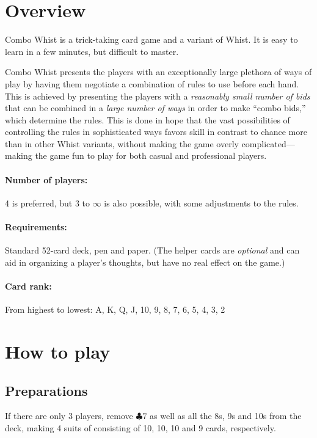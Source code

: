 \documentclass[a4paper]{article} %
\author{By Joakim Nilsson}
\date{Development version (based on version \varVersion-\varLanguage)---\today}
\date{Version \varVersion-\varLanguage---\today}
\begin{document}

	\introPages
	\pagebreak


	\section{Overview}
	Combo Whist is a trick-taking card game and a variant of Whist. It is easy to learn in a few minutes, but difficult to master.

	Combo Whist presents the players with an exceptionally large plethora of ways of play by having them negotiate a combination of rules to use before each hand. This is achieved by presenting the players with a \emph{reasonably small number of bids} that can be combined in a \emph{large number of ways} in order to make ``combo bids,'' which determine the rules. This is done in hope that the vast possibilities of controlling the rules in sophisticated ways favors skill in contrast to chance more than in other Whist variants, without making the game overly complicated---making the game fun to play for both casual and professional players.

	\paragraph{Number of players:}
	4 is preferred, but 3 to $\infty$ is also possible, with some adjustments to the rules.

	\paragraph{Requirements:}
	Standard 52-card deck, pen and paper. (The helper cards are \emph{optional} and can aid in organizing a player's thoughts, but have no real effect on the game.)

	\paragraph{Card rank:}
	From highest to lowest: A, K, Q, J, 10, 9, 8, 7, 6, 5, 4, 3, 2

	\section{How to play}
	\subsection{Preparations}
	If there are only 3 players, remove $\clubsuit 7$ as well as all the 8s, 9s and 10s from the deck, making 4 suits of consisting of 10, 10, 10 and 9 cards, respectively.
\end{document}
